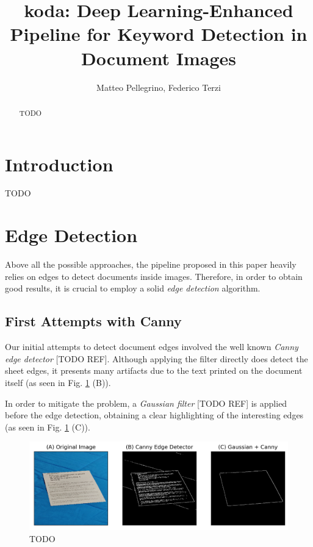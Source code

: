 \documentclass[]{article}
\title{koda: Deep Learning-Enhanced Pipeline for Keyword Detection in Document Images}
\author{Matteo Pellegrino, Federico Terzi}
\begin{document}
\maketitle

\begin{abstract}
TODO
\end{abstract}

\section{Introduction}
TODO


\section{Edge Detection}

Above all the possible approaches, the pipeline proposed in this paper heavily
relies on edges to detect documents inside images. Therefore, in order to obtain
good results, it is crucial to employ a solid \textit{edge detection} algorithm.


\subsection{First Attempts with Canny}

Our initial attempts to detect document edges involved the well known \textit{Canny edge detector} [TODO REF]. Although applying the filter directly does detect the sheet edges, it presents many artifacts
due to the text printed on the document itself (as seen in Fig. \ref{fig:canny_gaussian} (B)).

In order to mitigate the problem, a \textit{Gaussian filter} [TODO REF] is applied before the edge detection, obtaining a clear highlighting of the interesting edges (as seen in Fig.  \ref{fig:canny_gaussian} (C)).

\begin{figure}[!htb]
	\includegraphics[width=\linewidth]{canny_gaussian.png}
	\caption{TODO}
	\label{fig:canny_gaussian}
\end{figure}
\end{document}
